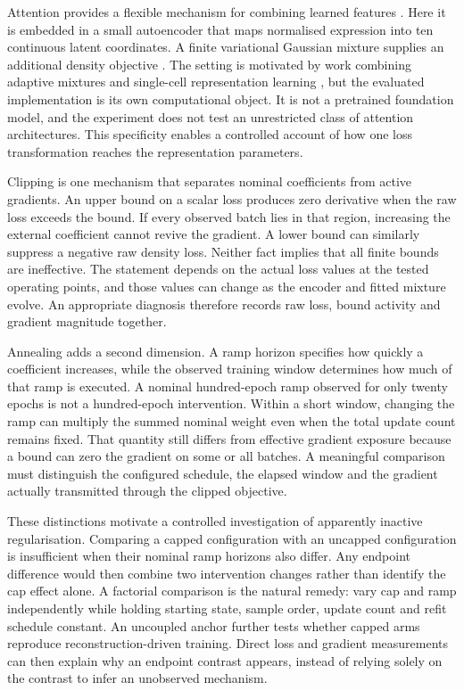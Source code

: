 \documentclass[11pt]{article}
\begin{document}
Attention provides a flexible mechanism for combining learned features \cite{vaswani2017attention}. Here it is embedded in a small autoencoder that maps normalised expression into ten continuous latent coordinates. A finite variational Gaussian mixture supplies an additional density objective \cite{blei2006variational}. The setting is motivated by work combining adaptive mixtures and single-cell representation learning \cite{an2024scdac}, but the evaluated implementation is its own computational object. It is not a pretrained foundation model, and the experiment does not test an unrestricted class of attention architectures. This specificity enables a controlled account of how one loss transformation reaches the representation parameters.

Clipping is one mechanism that separates nominal coefficients from active gradients. An upper bound on a scalar loss produces zero derivative when the raw loss exceeds the bound. If every observed batch lies in that region, increasing the external coefficient cannot revive the gradient. A lower bound can similarly suppress a negative raw density loss. Neither fact implies that all finite bounds are ineffective. The statement depends on the actual loss values at the tested operating points, and those values can change as the encoder and fitted mixture evolve. An appropriate diagnosis therefore records raw loss, bound activity and gradient magnitude together.

Annealing adds a second dimension. A ramp horizon specifies how quickly a coefficient increases, while the observed training window determines how much of that ramp is executed. A nominal hundred-epoch ramp observed for only twenty epochs is not a hundred-epoch intervention. Within a short window, changing the ramp can multiply the summed nominal weight even when the total update count remains fixed. That quantity still differs from effective gradient exposure because a bound can zero the gradient on some or all batches. A meaningful comparison must distinguish the configured schedule, the elapsed window and the gradient actually transmitted through the clipped objective.

These distinctions motivate a controlled investigation of apparently inactive regularisation. Comparing a capped configuration with an uncapped configuration is insufficient when their nominal ramp horizons also differ. Any endpoint difference would then combine two intervention changes rather than identify the cap effect alone. A factorial comparison is the natural remedy: vary cap and ramp independently while holding starting state, sample order, update count and refit schedule constant. An uncoupled anchor further tests whether capped arms reproduce reconstruction-driven training. Direct loss and gradient measurements can then explain why an endpoint contrast appears, instead of relying solely on the contrast to infer an unobserved mechanism.
\end{document}
